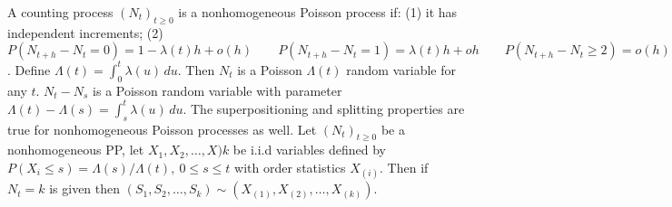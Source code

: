 A counting process $(N_t)_{t \ge 0}$ is a nonhomogeneous Poisson process if:
(1) it has independent increments;
(2) $P(N_{t+h} - N_t = 0) = 1 - \lambda(t)h +o(h) \qquad P(N_{t+h} - N_t = 1) = \lambda(t)h +oh \qquad P(N_{t+h} - N_t \ge 2) = o(h)$.
 Define 
$\Lambda(t) = \int^t_0 \lambda(u)\, du.$ 
Then $N_t$ is a Poisson $\Lambda(t)$ random variable for any $t$.
 $N_t - N_s$ is a Poisson random variable with parameter $\Lambda(t) -\Lambda(s) = \int^{t}_s \lambda(u)\, du.$
 The superpositioning and splitting properties are true for nonhomogeneous Poisson processes as well.
 Let $(N_t)_{t \ge 0}$ be a nonhomogeneous PP, let $X_1, X_2,\ldots, X)k$ be i.i.d variables defined by $P(X_i \le s) = \Lambda(s)/\Lambda(t),\ 0 \le s \le t$ with order statistics $X_{(i)}$. Then if $N_t = k$ is given then 
$(S_1, S_2, \ldots, S_k) \sim (X_{(1)},X_{(2)},\ldots,X_{(k)})$.